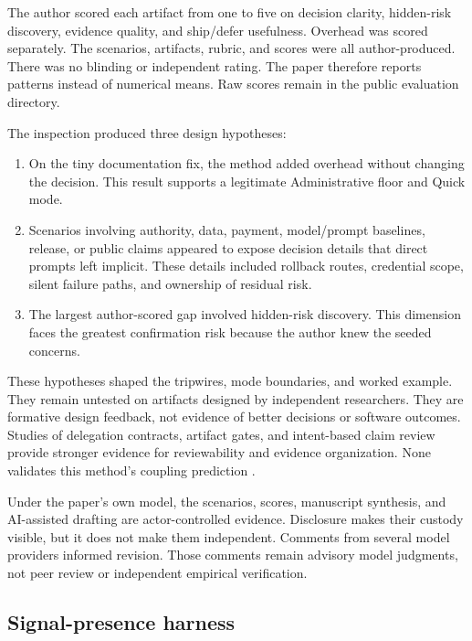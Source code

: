 \documentclass[11pt]{article}
\begin{document}
The author scored each artifact from one to five on decision clarity, hidden-risk discovery, evidence quality, and ship/defer usefulness. Overhead was scored separately. The scenarios, artifacts, rubric, and scores were all author-produced. There was no blinding or independent rating. The paper therefore reports patterns instead of numerical means. Raw scores remain in the public evaluation directory.

The inspection produced three design hypotheses:

\begin{enumerate}
  \item On the tiny documentation fix, the method added overhead without changing the decision. This result supports a legitimate Administrative floor and Quick mode.
  \item Scenarios involving authority, data, payment, model/prompt baselines, release, or public claims appeared to expose decision details that direct prompts left implicit. These details included rollback routes, credential scope, silent failure paths, and ownership of residual risk.
  \item The largest author-scored gap involved hidden-risk discovery. This dimension faces the greatest confirmation risk because the author knew the seeded concerns.
\end{enumerate}

These hypotheses shaped the tripwires, mode boundaries, and worked example. They remain untested on artifacts designed by independent researchers. They are formative design feedback, not evidence of better decisions or software outcomes. Studies of delegation contracts, artifact gates, and intent-based claim review provide stronger evidence for reviewability and evidence organization. None validates this method's coupling prediction \citep{schmalbach2026contracts,ravuru2026artifact,ming2026reviewability}.

Under the paper's own model, the scenarios, scores, manuscript synthesis, and AI-assisted drafting are actor-controlled evidence. Disclosure makes their custody visible, but it does not make them independent. Comments from several model providers informed revision. Those comments remain advisory model judgments, not peer review or independent empirical verification.

\subsection{Signal-presence harness}
\end{document}
